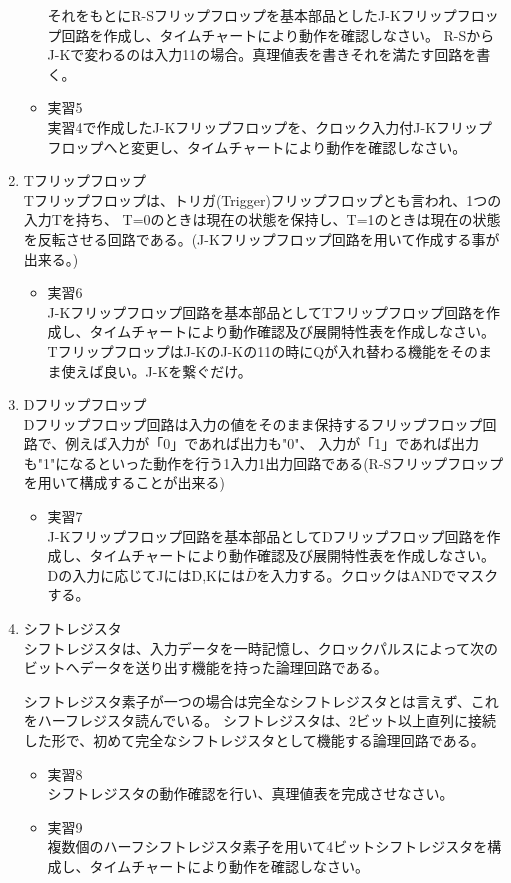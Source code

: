 \documentclass[dvipdfmx, a4paper]{jsarticle}
\begin{document}
\begin{enumerate}
\begin{itemize}
						それをもとにR-Sフリップフロップを基本部品としたJ-Kフリップフロップ回路を作成し、タイムチャートにより動作を確認しなさい。
						R-SからJ-Kで変わるのは入力11の場合。真理値表を書きそれを満たす回路を書く。
					\item 実習5 \\
						実習4で作成したJ-Kフリップフロップを、クロック入力付J-Kフリップフロップへと変更し、タイムチャートにより動作を確認しなさい。
				\end{itemize}
			\item Tフリップフロップ \\
				Tフリップフロップは、トリガ(Trigger)フリップフロップとも言われ、1つの入力Tを持ち、
				T=0のときは現在の状態を保持し、T=1のときは現在の状態を反転させる回路である。(J-Kフリップフロップ回路を用いて作成する事が出来る。)
				\begin{itemize}
					\item 実習6 \\
						J-Kフリップフロップ回路を基本部品としてTフリップフロップ回路を作成し、タイムチャートにより動作確認及び展開特性表を作成しなさい。
						TフリップフロップはJ-KのJ-Kの11の時にQが入れ替わる機能をそのまま使えば良い。J-Kを繋ぐだけ。
				\end{itemize}
			\item Dフリップフロップ \\
				Dフリップフロップ回路は入力の値をそのまま保持するフリップフロップ回路で、例えば入力が「0」であれば出力も"0"、
				入力が「1」であれば出力も"1"になるといった動作を行う1入力1出力回路である(R-Sフリップフロップを用いて構成することが出来る)
				\begin{itemize}
					\item 実習7 \\
					J-Kフリップフロップ回路を基本部品としてDフリップフロップ回路を作成し、タイムチャートにより動作確認及び展開特性表を作成しなさい。
					Dの入力に応じてJにはD,Kには$\bar{D}$を入力する。クロックはANDでマスクする。
				\end{itemize}
			\item シフトレジスタ \\
				シフトレジスタは、入力データを一時記憶し、クロックパルスによって次のビットへデータを送り出す機能を持った論理回路である。\par
				シフトレジスタ素子が一つの場合は完全なシフトレジスタとは言えず、これをハーフレジスタ読んでいる。
				シフトレジスタは、2ビット以上直列に接続した形で、初めて完全なシフトレジスタとして機能する論理回路である。
				\begin{itemize}
					\item 実習8 \\
						シフトレジスタの動作確認を行い、真理値表を完成させなさい。
					\item 実習9 \\
						複数個のハーフシフトレジスタ素子を用いて4ビットシフトレジスタを構成し、タイムチャートにより動作を確認しなさい。
				\end{itemize}
		\end{enumerate}
\end{document}
